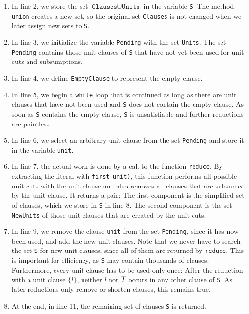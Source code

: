 \begin{enumerate}
\item In line 2, we store the set $\texttt{Clauses} \cup \texttt{Units}$ in the variable \texttt{S}.  The method
  \texttt{union} creates a new set, so the original set \texttt{Clauses} is not changed when we later assign
  new sets to \texttt{S}.
\item In line 3, we initialize the variable \texttt{Pending} with the set \texttt{Units}.  The set
  \texttt{Pending} contains those unit clauses of \texttt{S} that have not yet been used for unit cuts and
  subsumptions.
\item In line 4, we define \texttt{EmptyClause} to represent the empty clause.
\item In line 5, we begin a \texttt{while} loop that is continued as long as there are unit clauses that have
  not been used and \texttt{S} does not contain the empty clause.  As soon as \texttt{S} contains the empty
  clause, \texttt{S} is unsatisfiable and further reductions are pointless.
\item In line 6, we select an arbitrary unit clause from the set \texttt{Pending} and store it in the variable \texttt{unit}.
\item In line 7, the actual work is done by a call to the function \texttt{reduce}. By extracting the literal
  with \texttt{first(unit)}, this function performs all possible unit cuts with the unit clause and also
  removes all clauses that are subsumed by the unit clause.  It returns a pair: The first component is the
  simplified set of clauses, which we store in \texttt{S} in line 8.  The second component is the set
  \texttt{NewUnits} of those unit clauses that are created by the unit cuts.
\item In line 9, we remove the clause \texttt{unit} from the set \texttt{Pending}, since it has now been used,
  and add the new unit clauses.  Note that we never have to search the set \texttt{S} for new unit clauses,
  since all of them are returned by \texttt{reduce}.  This is important for efficiency, as \texttt{S} may
  contain thousands of clauses.  Furthermore, every unit clause has to be used only once:  After the reduction
  with a unit clause $\{l\}$, neither $l$ nor $\overline{\,l\,}$ occurs in any other clause of \texttt{S}.  As
  later reductions only remove or shorten clauses, this remains true.
\item At the end, in line 11, the remaining set of clauses \texttt{S} is returned.
\end{enumerate}



